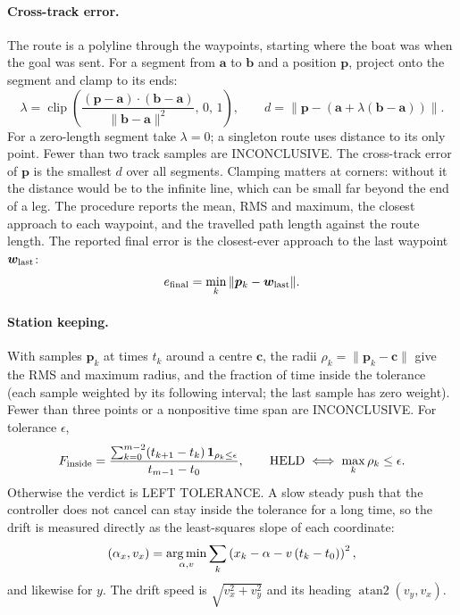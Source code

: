 \paragraph{Cross-track error.} The route is a polyline through the waypoints,
starting where the boat was when the goal was sent. For a segment from $\bm a$
to $\bm b$ and a position $\bm p$, project onto the segment and clamp to its ends:
\[
  \lambda = \operatorname{clip}\!\left(\frac{(\bm p-\bm a)\cdot(\bm b-\bm a)}{\|\bm b-\bm a\|^2},\,0,\,1\right),\qquad
  d = \left\|\bm p - (\bm a + \lambda(\bm b-\bm a))\right\|.
\]
For a zero-length segment take $\lambda=0$; a singleton route uses distance
to its only point. Fewer than two track samples are INCONCLUSIVE.
The cross-track error of $\bm p$ is the smallest $d$ over all segments. Clamping
matters at corners: without it the distance would be to the infinite line, which
can be small far beyond the end of a leg. The procedure reports the mean, RMS and
maximum, the closest approach to each waypoint, and the travelled path length
against the route length. The reported final error is the closest-ever approach
to the last waypoint $\bm w_{\rm last}$:
\[e_{\rm final}=\min_k\|\bm p_k-\bm w_{\rm last}\|.\]

\paragraph{Station keeping.} With samples $\bm p_k$ at times $t_k$ around a
centre $\bm c$, the radii $\rho_k = \|\bm p_k - \bm c\|$ give the RMS and maximum
radius, and the fraction of time inside the tolerance (each sample weighted by its
following interval; the last sample has zero weight). Fewer than three points
or a nonpositive time span are INCONCLUSIVE. For tolerance $\epsilon$,
\[
 F_{\rm inside}=\frac{\sum_{k=0}^{m-2}(t_{k+1}-t_k)\,\mathbf1_{\rho_k\le\epsilon}}{t_{m-1}-t_0},
 \qquad \text{HELD}\iff\max_k\rho_k\le\epsilon.
\]
Otherwise the verdict is LEFT TOLERANCE. A slow steady push that the controller
does not cancel can stay inside
the tolerance for a long time, so the drift is measured directly as the
least-squares slope of each coordinate:
\[
  (\alpha_x, v_x) = \operatorname*{arg\,min}_{\alpha,v} \sum_k \left(x_k - \alpha - v\,(t_k - t_0)\right)^2,
\]
and likewise for $y$. The drift speed is $\sqrt{v_x^2+v_y^2}$ and its heading
$\operatorname{atan2}(v_y, v_x)$.
